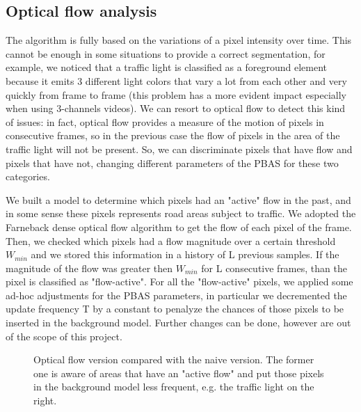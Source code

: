 \subsection*{Optical flow analysis}
The algorithm is fully based on the variations of a pixel intensity over time. This cannot be enough in some situations to provide a correct segmentation, for example, we noticed that a traffic light is classified as a foreground element because it emits 3 different light colors that vary a lot from each other and very quickly from frame to frame (this problem has a more evident impact especially when using 3-channels videos). We can resort to optical flow to detect this kind of issues: in fact, optical flow provides a measure of the motion of pixels in consecutive frames, so in the previous case the flow of pixels in the area of the traffic light will not be present. So, we can discriminate pixels that have flow and pixels that have not, changing different parameters of the PBAS for these two categories.

We built a model to determine which pixels had an "active" flow in the past, and in some sense these pixels represents road areas subject to traffic. We adopted the Farneback dense optical flow algorithm to get the flow of each pixel of the frame. Then, we checked which pixels had a flow magnitude over a certain threshold $W_{min}$ and we stored this information in a history of L previous samples. If the magnitude of the flow was greater then $W_{min}$ for L consecutive frames, than the pixel is classified as "flow-active". For all the "flow-active" pixels, we applied some ad-hoc adjustments for the PBAS parameters, in particular we decremented the update frequency T by a constant to penalyze the chances of those pixels to be inserted in the background model. Further changes can be done, however are out of the scope of this project.

\begin{figure}[!t]
    \centering
    \newline
	\caption{Optical flow version compared with the naive version. The former one is aware of areas that have an "active flow" and put those pixels in the background model less frequent, e.g. the traffic light on the right.}
\end{figure}

